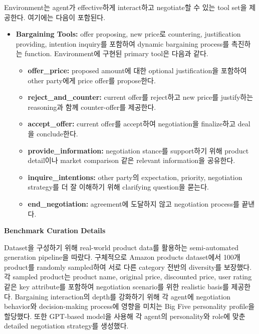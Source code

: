 Environment는 agent가 effective하게 interact하고 negotiate할 수 있는 tool set을 제공한다. 여기에는 다음이 포함된다.
\begin{itemize}
    \item \textbf{Bargaining Tools:} offer proposing, new price로 countering, justification providing, intention inquiry를 포함하여 dynamic bargaining process를 촉진하는 function. Environment에 구현된 primary tool은 다음과 같다.
    \begin{itemize}
        \item \textbf{offer\_price:} proposed amount에 대한 optional justification을 포함하여 other party에게 price offer를 propose한다.

        \item \textbf{reject\_and\_counter:} current offer를 reject하고 new price를 justify하는 reasoning과 함께 counter-offer를 제공한다.

        \item \textbf{accept\_offer:} current offer를 accept하여 negotiation을 finalize하고 deal을 conclude한다.

        \item \textbf{provide\_information:} negotiation stance를 support하기 위해 product detail이나 market comparison 같은 relevant information을 공유한다.

        \item \textbf{inquire\_intentions:} other party의 expectation, priority, negotiation strategy를 더 잘 이해하기 위해 clarifying question을 묻는다.

        \item \textbf{end\_negotiation:} agreement에 도달하지 않고 negotiation process를 끝낸다.
    \end{itemize}
\end{itemize}

\textbf{Benchmark Curation Details}

Dataset을 구성하기 위해 real-world product data를 활용하는 semi-automated generation pipeline을 따랐다. 구체적으로 Amazon products dataset\cite{asaniczka_2023}에서 100개 product를 randomly sampled하여 서로 다른 category 전반의 diversity를 보장했다. 각 sampled product는 product name, original price, discounted price, user rating 같은 key attribute를 포함하여 negotiation scenario를 위한 realistic basis를 제공한다. Bargaining interaction의 depth를 강화하기 위해 각 agent에 negotiation behavior와 decision-making process에 영향을 미치는 Big Five personality profile을 할당했다. 또한 GPT-based model을 사용해 각 agent의 personality와 role에 맞춘 detailed negotiation strategy를 생성했다.

